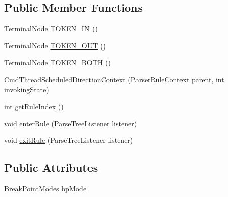 \subsection*{Public Member Functions}
\begin{DoxyCompactItemize}
\item 
Terminal\+Node \hyperlink{classgov_1_1nasa_1_1jpf_1_1inspector_1_1server_1_1expression_1_1parser_1_1_expression_grammar_pa3ae49d5d83c380526042a5aff91ee0a2_afedb190221c92692ff0d001daf08bdce}{T\+O\+K\+E\+N\+\_\+\+IN} ()
\item 
Terminal\+Node \hyperlink{classgov_1_1nasa_1_1jpf_1_1inspector_1_1server_1_1expression_1_1parser_1_1_expression_grammar_pa3ae49d5d83c380526042a5aff91ee0a2_a8f4550c7d70ee74b1eb921946d118644}{T\+O\+K\+E\+N\+\_\+\+O\+UT} ()
\item 
Terminal\+Node \hyperlink{classgov_1_1nasa_1_1jpf_1_1inspector_1_1server_1_1expression_1_1parser_1_1_expression_grammar_pa3ae49d5d83c380526042a5aff91ee0a2_accf5e553a3e95b1fe12775e3959ac4b6}{T\+O\+K\+E\+N\+\_\+\+B\+O\+TH} ()
\item 
\hyperlink{classgov_1_1nasa_1_1jpf_1_1inspector_1_1server_1_1expression_1_1parser_1_1_expression_grammar_pa3ae49d5d83c380526042a5aff91ee0a2_a63c1e626ae963196388331f17b57cd40}{Cmd\+Thread\+Scheduled\+Direction\+Context} (Parser\+Rule\+Context parent, int invoking\+State)
\item 
int \hyperlink{classgov_1_1nasa_1_1jpf_1_1inspector_1_1server_1_1expression_1_1parser_1_1_expression_grammar_pa3ae49d5d83c380526042a5aff91ee0a2_a2cc112dda6544b772f3d88bf3760da69}{get\+Rule\+Index} ()
\item 
void \hyperlink{classgov_1_1nasa_1_1jpf_1_1inspector_1_1server_1_1expression_1_1parser_1_1_expression_grammar_pa3ae49d5d83c380526042a5aff91ee0a2_a544bfbc57aa42c090cee44803ad3dba5}{enter\+Rule} (Parse\+Tree\+Listener listener)
\item 
void \hyperlink{classgov_1_1nasa_1_1jpf_1_1inspector_1_1server_1_1expression_1_1parser_1_1_expression_grammar_pa3ae49d5d83c380526042a5aff91ee0a2_a4d3e80ba2b4c6300c2551382e29f0b23}{exit\+Rule} (Parse\+Tree\+Listener listener)
\end{DoxyCompactItemize}
\subsection*{Public Attributes}
\begin{DoxyCompactItemize}
\item 
\hyperlink{enumgov_1_1nasa_1_1jpf_1_1inspector_1_1server_1_1breakpoints_1_1_break_point_modes}{Break\+Point\+Modes} \hyperlink{classgov_1_1nasa_1_1jpf_1_1inspector_1_1server_1_1expression_1_1parser_1_1_expression_grammar_pa3ae49d5d83c380526042a5aff91ee0a2_a6b918809e1604f546ba4cd87f491b1ec}{bp\+Mode}
\end{DoxyCompactItemize}



